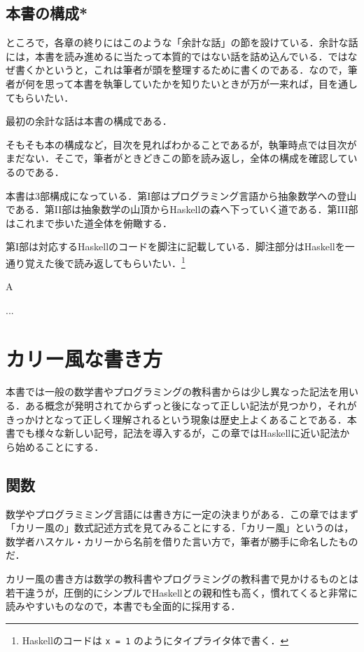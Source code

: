 \documentclass[a4paper,twocolumn]{jsbook}
\newcommand{\programminglanguage}[1]{\textsf{#1}}
\newcommand{\haskell}{\programminglanguage{Haskell}}
\newenvironment{leader}{\begingroup\gt}{\endgroup}
\newenvironment{note}[1]{\begin{boxnote}\begin{center}#1\end{center}}{\end{boxnote}}
\newcommand{\code}[1]{\texttt{#1}}
\begin{document}
\section{本書の構成*}

ところで，各章の終りにはこのような「余計な話」の節を設けている．余計な話には，本書を読み進めるに当たって本質的ではない話を詰め込んでいる．ではなぜ書くかというと，これは筆者が頭を整理するために書くのである．なので，筆者が何を思って本書を執筆していたかを知りたいときが万が一来れば，目を通してもらいたい．

最初の余計な話は本書の構成である．

そもそも本の構成など，目次を見ればわかることであるが，執筆時点では目次がまだない．そこで，筆者がときどきこの節を読み返し，全体の構成を確認しているのである．

本書は3部構成になっている．第I部はプログラミング言語から抽象数学への登山である．第II部は抽象数学の山頂から\haskell の森へ下っていく道である．第III部はこれまで歩いた道全体を俯瞰する．

第I部は対応する\haskell のコードを脚注に記載している．脚注部分は\haskell を一通り覚えた後で読み返してもらいたい．\footnote{\haskell のコードは \code{x = 1} のようにタイプライタ体で書く．}

\begin{note}{A}
...
\end{note}


\chapter{カリー風な書き方}
\begin{leader}
本書では一般の数学書やプログラミングの教科書からは少し異なった記法を用いる．ある概念が発明されてからずっと後になって正しい記法が見つかり，それがきっかけとなって正しく理解されるという現象は歴史上よくあることである．本書でも様々な新しい記号，記法を導入するが，この章では\haskell に近い記法から始めることにする．
\end{leader}

\section{関数}

数学やプログラミミング言語には書き方に一定の決まりがある．この章ではまず「カリー風の」数式記述方式を見てみることにする．「カリー風」というのは，数学者ハスケル・カリーから名前を借りた言い方で，筆者が勝手に命名したものだ．

カリー風の書き方は数学の教科書やプログラミングの教科書で見かけるものとは若干違うが，圧倒的にシンプルで\haskell との親和性も高く，慣れてくると非常に読みやすいものなので，本書でも全面的に採用する．
\end{document}
